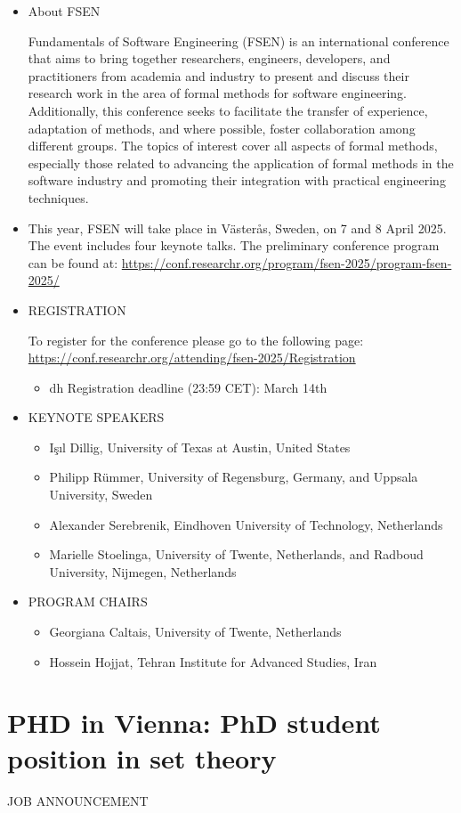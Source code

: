\documentclass[prodmode,acmtecs]{acmsmall} %
\begin{document}
\begin{itemize}\item About FSEN  
 
  Fundamentals of Software Engineering (FSEN) is an international conference that aims to bring together researchers, engineers, developers, and practitioners from academia and industry to present and discuss their research work in the area of formal methods for software engineering. Additionally, this conference seeks to facilitate the transfer of experience, adaptation of methods, and where possible, foster collaboration among different groups. The topics of interest cover all aspects of formal methods, especially those related to advancing the application of formal methods in the software industry and promoting their integration with practical engineering techniques.  
 
\item  This year, FSEN will take place in Västerås, Sweden, on 7 and 8 April 2025. The event includes four keynote talks. The preliminary conference program can be found at: \href{https://conf.researchr.org/program/fsen-2025/program-fsen-2025/}{https://conf.researchr.org/program/fsen-2025/program-fsen-2025/} 
 
\item  REGISTRATION 
 
  To register for the conference please go to the following page: \href{https://conf.researchr.org/attending/fsen-2025/Registration}{https://conf.researchr.org/attending/fsen-2025/Registration} 
 
\begin{itemize}\item  dh Registration deadline (23:59 CET): March 14th 
\end{itemize} 
\item  KEYNOTE SPEAKERS  
 
\begin{itemize}\item  Işıl Dillig, University of Texas at Austin, United States
\item  Philipp Rümmer, University of Regensburg, Germany, and Uppsala University, Sweden
\item  Alexander Serebrenik, Eindhoven University of Technology, Netherlands
\item  Marielle Stoelinga, University of Twente, Netherlands, and Radboud University, Nijmegen, Netherlands
\end{itemize} 
\item  PROGRAM CHAIRS  
 
\begin{itemize}\item  Georgiana Caltais, University of Twente, Netherlands
\item  Hossein Hojjat, Tehran Institute for Advanced Studies, Iran
\end{itemize} 
\end{itemize}\section{PHD in Vienna: PhD student position in set theory}\label{PHDinVienna}JOB ANNOUNCEMENT 
\end{document}
